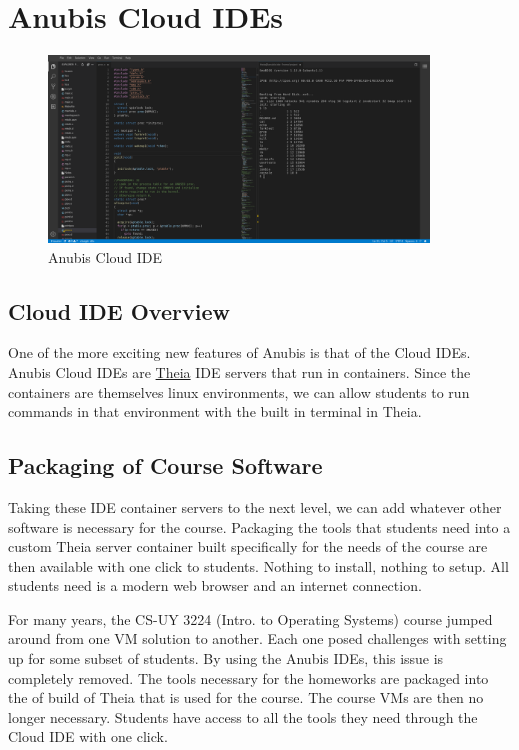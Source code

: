 \chapter{Anubis Cloud IDEs}\label{ch:cloud_ides}

\begin{figure}[ht]
    \centering
    \includegraphics[width=0.9\textwidth]{figures/theia2}
    \caption{Anubis Cloud IDE\label{fig:theia2}}
\end{figure}

\section{Cloud IDE Overview}

One of the more exciting new features of Anubis is that of the Cloud IDEs.
Anubis Cloud IDEs are \href{https://theia-ide.org/}{Theia} IDE servers that run in containers.
Since the containers are themselves linux environments, we can allow students
to run commands in that environment with the built in terminal in Theia.

\section{Packaging of Course Software}

Taking these IDE container servers to the next level, we can add whatever 
other software is necessary for the course.
Packaging the tools that students need into a custom Theia server container
built specifically for the needs of the course are then available with 
one click to students.
Nothing to install, nothing to setup.
All students need is a modern web browser and an internet connection.

For many years, the CS-UY 3224 (Intro. to Operating Systems) course
jumped around from one VM solution to another.
Each one posed challenges with setting up for some subset of students.
By using the Anubis IDEs, this issue is completely removed.
The tools necessary for the homeworks are packaged into the of build 
of Theia that is used for the course.
The course VMs are then no longer necessary.
Students have access to all the tools they need through the Cloud IDE
with one click.

